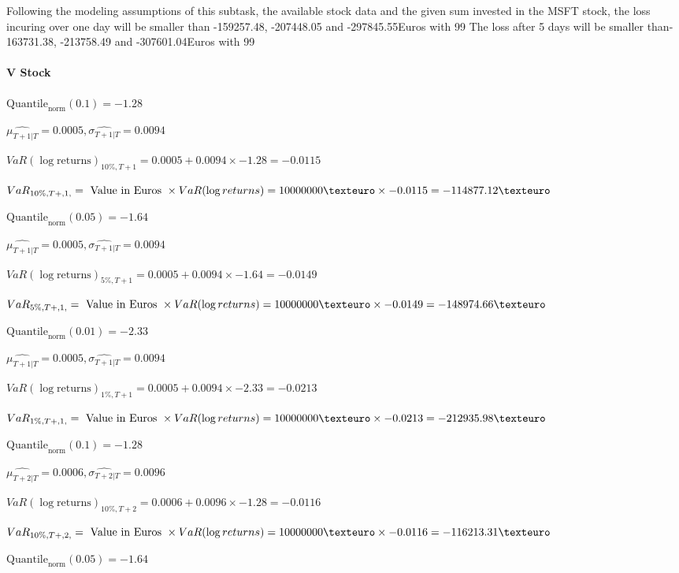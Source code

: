 Following the modeling assumptions of this subtask, the available stock data and the given sum invested in the MSFT stock, the loss incuring over one day will be smaller than -159257.48, -207448.05 and -297845.55Euros with 99%
The loss after 5 days will be smaller than-163731.38, -213758.49 and -307601.04Euros with 99%

\paragraph{V Stock}


$\text{Quantile}_\text{norm}(0.1) = -1.28$

$\hat{\mu_{T+1|T}} = 0.0005, \hat{\sigma_{T+1|T}} = 0.0094$

$VaR(\log \text{returns})_{10\%, T + 1} = 0.0005 + 0.0094\times-1.28 = -0.0115$

$VaR_{10\%, T + ,1,} = \text{ Value in Euros } \times VaR(\log returns) = 10 000 000 \texteuro \times-0.0115 = -114877.12 \texteuro$


$\text{Quantile}_\text{norm}(0.05) = -1.64$

$\hat{\mu_{T+1|T}} = 0.0005, \hat{\sigma_{T+1|T}} = 0.0094$

$VaR(\log \text{returns})_{5\%, T + 1} = 0.0005 + 0.0094\times-1.64 = -0.0149$

$VaR_{5\%, T + ,1,} = \text{ Value in Euros } \times VaR(\log returns) = 10 000 000 \texteuro \times-0.0149 = -148974.66 \texteuro$


$\text{Quantile}_\text{norm}(0.01) = -2.33$

$\hat{\mu_{T+1|T}} = 0.0005, \hat{\sigma_{T+1|T}} = 0.0094$

$VaR(\log \text{returns})_{1\%, T + 1} = 0.0005 + 0.0094\times-2.33 = -0.0213$

$VaR_{1\%, T + ,1,} = \text{ Value in Euros } \times VaR(\log returns) = 10 000 000 \texteuro \times-0.0213 = -212935.98 \texteuro$


$\text{Quantile}_\text{norm}(0.1) = -1.28$

$\hat{\mu_{T+2|T}} = 0.0006, \hat{\sigma_{T+2|T}} = 0.0096$

$VaR(\log \text{returns})_{10\%, T + 2} = 0.0006 + 0.0096\times-1.28 = -0.0116$

$VaR_{10\%, T + ,2,} = \text{ Value in Euros } \times VaR(\log returns) = 10 000 000 \texteuro \times-0.0116 = -116213.31 \texteuro$


$\text{Quantile}_\text{norm}(0.05) = -1.64$

